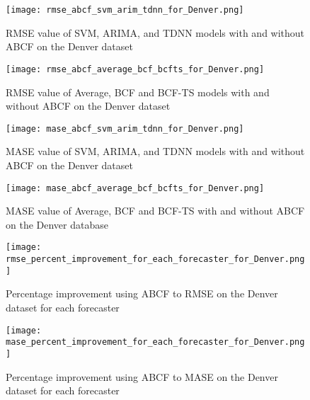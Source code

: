 \begin{figure}[p]
	\begin{center}
		\texttt{[image: rmse\_abcf\_svm\_arim\_tdnn\_for\_Denver.png]}
	\end{center}
	\caption{RMSE value of SVM, ARIMA, and TDNN models with and without ABCF on the Denver dataset}
	\label{fig:rmse_compare_denver_svm}
\end{figure}

\begin{figure}[p]
	\begin{center}
		\texttt{[image: rmse\_abcf\_average\_bcf\_bcfts\_for\_Denver.png]}
	\end{center}
	\caption{RMSE value of Average, BCF and BCF-TS models with and without ABCF on the Denver dataset}
	\label{fig:rmse_compare_denver_bcf}
\end{figure}

\begin{figure}[p]
	\begin{center}
		\texttt{[image: mase\_abcf\_svm\_arim\_tdnn\_for\_Denver.png]}
	\end{center}
	\caption{MASE value of SVM, ARIMA, and TDNN models with and without ABCF on the Denver dataset}
	\label{fig:mase_compare_denver_svm}
\end{figure}

\begin{figure}[p]
	\begin{center}
		\texttt{[image: mase\_abcf\_average\_bcf\_bcfts\_for\_Denver.png]}
	\end{center}
	\caption{MASE value of Average, BCF and BCF-TS with and without ABCF on the Denver database}
	\label{fig:mase_compare_denver_bcf}
\end{figure}

\begin{figure}[p]
	\begin{center}
		\texttt{[image: rmse\_percent\_improvement\_for\_each\_forecaster\_for\_Denver.png]}
	\end{center}
	\caption{Percentage improvement using ABCF to RMSE on the Denver dataset for each forecaster}
	\label{fig:rmse_improvement_percent_denver}
\end{figure}

\begin{figure}[p]
	\begin{center}
		\texttt{[image: mase\_percent\_improvement\_for\_each\_forecaster\_for\_Denver.png]}
	\end{center}
	\caption{Percentage improvement using ABCF to MASE on the Denver dataset for each forecaster}
	\label{fig:mase_improvement_percent_denver}
\end{figure}



